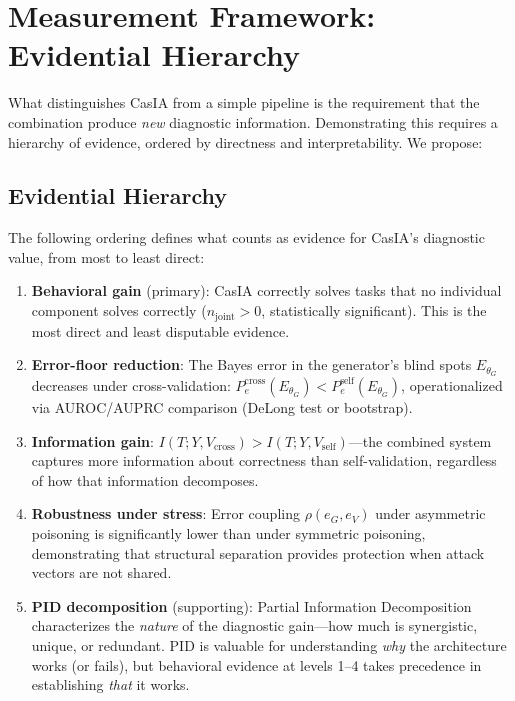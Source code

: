 \documentclass[11pt,a4paper]{article}
\theoremstyle{definition}
\newcommand{\thetaG}{\theta_G}
\begin{document}
\section{Measurement Framework: Evidential Hierarchy}
\label{sec:pid}

What distinguishes CasIA from a simple pipeline is the requirement that the combination produce \emph{new} diagnostic information. Demonstrating this requires a hierarchy of evidence, ordered by directness and interpretability. We propose:

\subsection{Evidential Hierarchy}
\label{subsec:hierarchy}

The following ordering defines what counts as evidence for CasIA's diagnostic value, from most to least direct:

\begin{enumerate}[leftmargin=*,itemsep=3pt]
\item \textbf{Behavioral gain} (primary): CasIA correctly solves tasks that no individual component solves correctly ($n_\text{joint} > 0$, statistically significant). This is the most direct and least disputable evidence.
\item \textbf{Error-floor reduction}: The Bayes error in the generator's blind spots $E_{\thetaG}$ decreases under cross-validation: $P_e^\text{cross}(E_{\thetaG}) < P_e^\text{self}(E_{\thetaG})$, operationalized via AUROC/AUPRC comparison (DeLong test or bootstrap).
\item \textbf{Information gain}: $I(T; Y, V_\text{cross}) > I(T; Y, V_\text{self})$---the combined system captures more information about correctness than self-validation, regardless of how that information decomposes.
\item \textbf{Robustness under stress}: Error coupling $\rho(e_G, e_V)$ under asymmetric poisoning is significantly lower than under symmetric poisoning, demonstrating that structural separation provides protection when attack vectors are not shared.
\item \textbf{PID decomposition} (supporting): Partial Information Decomposition characterizes the \emph{nature} of the diagnostic gain---how much is synergistic, unique, or redundant. PID is valuable for understanding \emph{why} the architecture works (or fails), but behavioral evidence at levels 1--4 takes precedence in establishing \emph{that} it works.
\end{enumerate}
\end{document}

